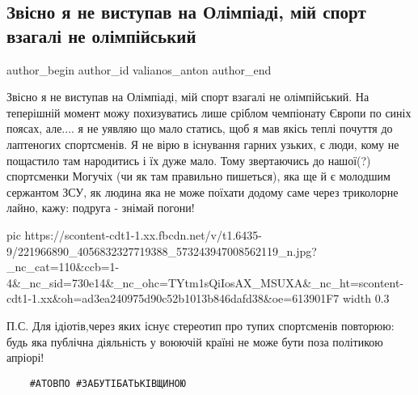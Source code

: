  
 
 
 
 
 
\subsection{Звісно я не виступав на Олімпіаді, мій спорт взагалі не олімпійський}
\label{sec:09_08_2021.fb.valianos_anton.1.podruga_znimaj_pogony}
 
\ifcmt
 author_begin
   author_id valianos_anton
 author_end
\fi

Звісно я не виступав на Олімпіаді, мій спорт взагалі не олімпійський. На
теперішній момент можу похизуватись лише сріблом чемпіонату Європи по синіх
поясах, але.... я  не уявляю що мало статись, щоб я мав якісь теплі почуття до
лаптеногих спортсменів. Я не вірю в існування гарних узьких, є люди, кому не
пощастило там народитись і їх дуже мало. Тому звертаючись до нашої(?)
спортсменки Могучіх (чи як там правильно пишеться), яка ще й є молодшим сержантом
ЗСУ, як людина яка не може поїхати додому саме через триколорне лайно, кажу:
подруга - знімай погони!

\ifcmt
  pic https://scontent-cdt1-1.xx.fbcdn.net/v/t1.6435-9/221966890_4056832327719388_573243947008562119_n.jpg?_nc_cat=110&ccb=1-4&_nc_sid=730e14&_nc_ohc=TYtm1sQiIosAX_MSUXA&_nc_ht=scontent-cdt1-1.xx&oh=ad3ea240975d90c52b1013b846dafd38&oe=613901F7
  width 0.3
\fi

П.С. Для ідіотів,через яких існує стереотип про тупих спортсменів повторюю:
будь яка публічна діяльність у воюючій країні не може бути поза політикою
апріорі!

\begin{verbatim}
	#АТОВПО #ЗАБУТІБАТЬКІВЩИНОЮ
\end{verbatim}

